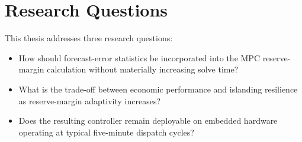 \section{Research Questions}

This thesis addresses three research questions:

\begin{itemize}[leftmargin=2.2em]
  \item[\textbf{RQ1.}] How should forecast-error statistics be incorporated into the MPC reserve-margin calculation without materially increasing solve time?
  \item[\textbf{RQ2.}] What is the trade-off between economic performance and islanding resilience as reserve-margin adaptivity increases?
  \item[\textbf{RQ3.}] Does the resulting controller remain deployable on embedded hardware operating at typical five-minute dispatch cycles?
\end{itemize}
